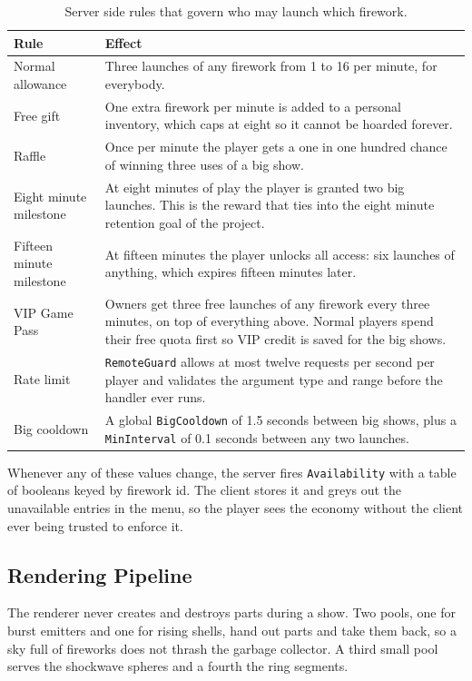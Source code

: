 \documentclass[12pt,letterpaper]{article}
\begin{document}
\begin{table}[H]
\centering
\footnotesize
\begin{tabular}{|p{4cm}|p{11.5cm}|}
\hline
\textbf{Rule} & \textbf{Effect} \\
\hline
Normal allowance & Three launches of any firework from 1 to 16 per minute, for everybody. \\
\hline
Free gift & One extra firework per minute is added to a personal inventory, which caps at eight so it cannot be hoarded forever. \\
\hline
Raffle & Once per minute the player gets a one in one hundred chance of winning three uses of a big show. \\
\hline
Eight minute milestone & At eight minutes of play the player is granted two big launches. This is the reward that ties into the eight minute retention goal of the project. \\
\hline
Fifteen minute milestone & At fifteen minutes the player unlocks all access: six launches of anything, which expires fifteen minutes later. \\
\hline
VIP Game Pass & Owners get three free launches of any firework every three minutes, on top of everything above. Normal players spend their free quota first so VIP credit is saved for the big shows. \\
\hline
Rate limit & \texttt{RemoteGuard} allows at most twelve requests per second per player and validates the argument type and range before the handler ever runs. \\
\hline
Big cooldown & A global \texttt{BigCooldown} of 1.5 seconds between big shows, plus a \texttt{MinInterval} of 0.1 seconds between any two launches. \\
\hline
\end{tabular}
\caption{Server side rules that govern who may launch which firework.}
\end{table}

Whenever any of these values change, the server fires \texttt{Availability} with a table of booleans keyed by firework id. The client stores it and greys out the unavailable entries in the menu, so the player sees the economy without the client ever being trusted to enforce it.

\subsection{Rendering Pipeline}

The renderer never creates and destroys parts during a show. Two pools, one for burst emitters and one for rising shells, hand out parts and take them back, so a sky full of fireworks does not thrash the garbage collector. A third small pool serves the shockwave spheres and a fourth the ring segments.
\end{document}
